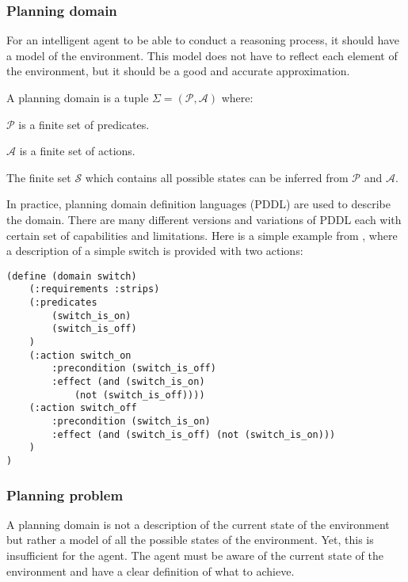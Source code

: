 \filbreak

\subsubsection{Planning domain}

For an intelligent agent to be able to conduct a reasoning process, 
it should have a model of the environment. 
This model does not have to reflect each element of the environment, 
but it should be a good and accurate approximation.
\begin{Tdef}

    A planning domain is a tuple $\Sigma= (\mathcal{P}, \mathcal{A})$ where:
    \vspace{-0.5em}
    \begin{compactitem}
        \item 
        $\mathcal{P}$ is a finite set of predicates.
        \item 
        $\mathcal{A}$ is a finite set of actions.
        \item 
        The finite set $\mathcal{S}$ which contains all possible states can be inferred from $\mathcal{P}$ and $\mathcal{A}$.
    \end{compactitem}
    \vspace{-0.5em}
\end{Tdef}

In practice, planning domain definition languages (PDDL) are used to describe the domain. There are many different versions and variations of PDDL each with certain set of capabilities and limitations. 
Here is a simple example from \cite{IntroductionPlanningDomainhaslum2019}, where a description of a simple switch is provided with two actions:
\vspace{0.5em}
\lstset{
  xleftmargin=2em,
  frame=single,
  framexleftmargin=1.5em, 
  framextopmargin=1.5em,
  framexbottommargin=1.5em,
}
\begin{lstlisting}[language=PDDL,caption=Domain definition example]
(define (domain switch)
    (:requirements :strips)
    (:predicates
        (switch_is_on)
        (switch_is_off)
    )
    (:action switch_on
        :precondition (switch_is_off)
        :effect (and (switch_is_on)
            (not (switch_is_off))))
    (:action switch_off
        :precondition (switch_is_on)
        :effect (and (switch_is_off) (not (switch_is_on)))
    )
)
\end{lstlisting}

\subsubsection{Planning problem}
A planning domain is not a description of the current state of the environment 
but rather a model of all the possible states of the environment. 
Yet, this is insufficient for the agent. The agent must be aware 
of the current state of the environment and have a clear definition 
of what to achieve.

